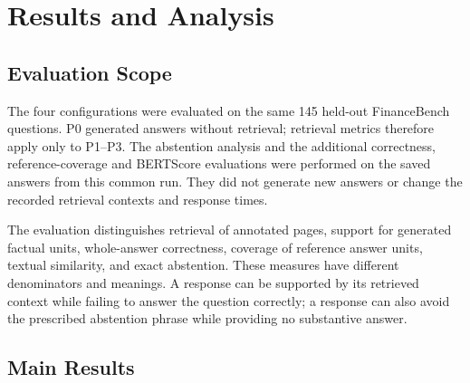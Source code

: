 
\section{Results and Analysis}
\fontsize{11}{13}\selectfont

\subsection{Evaluation Scope}
The four configurations were evaluated on the same 145 held-out FinanceBench
questions. P0 generated answers without retrieval; retrieval metrics therefore
apply only to P1--P3. The abstention analysis and the additional correctness,
reference-coverage and BERTScore evaluations were performed on the saved answers
from this common run. They did not generate new answers or change the recorded
retrieval contexts and response times.

The evaluation distinguishes retrieval of annotated pages, support for generated
factual units, whole-answer correctness, coverage of reference answer units,
textual similarity, and exact abstention. These measures have different
denominators and meanings. A response can be supported by its retrieved context
while failing to answer the question correctly; a response can also avoid the
prescribed abstention phrase while providing no substantive answer.

\subsection{Main Results}
